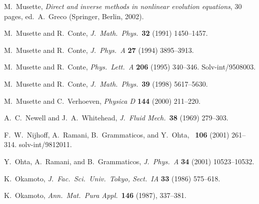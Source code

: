\documentclass[10pt]{article}
\begin{document}
\begin{thebibliography}{99}
 M.~Musette,
\textit{Direct and inverse methods in nonlinear evolution equations},
30 pages,
ed.~A.~Greco (Springer, Berlin, 2002).

 M.~Musette and R.~Conte,
{\it J.~Math.~Phys.}~{\bf 32} (1991) 1450--1457.

 M.~Musette and R.~Conte,
{\it J.~Phys.~A} {\bf 27} (1994) 3895--3913.

 M.~Musette and R.~Conte, 
{\it Phys.~Lett.~A} {\bf 206} (1995) 340--346. Solv-int/9508003.

 M.~Musette and R.~Conte,
{\it J.~Math.~Phys.}~{\bf 39} (1998) 5617--5630.

 M.~Musette and C.~Verhoeven,
{\it Physica D} {\bf 144} (2000) 211--220.

 A.~C.~Newell and J.~A.~Whitehead,
{\it J.~Fluid Mech.}~{\bf 38} (1969) 279--303.

 F.~W.~Nijhoff, A.~Ramani, B.~Grammaticos, and Y.~Ohta,
{\it \SAM}~{\bf 106} (2001) 261--314. solv-int/9812011.

 Y.~Ohta, A.~Ramani, and B.~Grammaticos,
{\it J.~Phys.~A} {\bf 34} (2001) 10523--10532. 

 K.~Okamoto,
{\it J.~Fac.~Sci.~Univ.~Tokyo, Sect.~IA} {\bf 33} (1986) 575--618.

 K.~Okamoto,
{\it Ann.~Mat.~Pura Appl.}~{\bf 146} (1987), 337--381.


\end{thebibliography}
\end{document}
